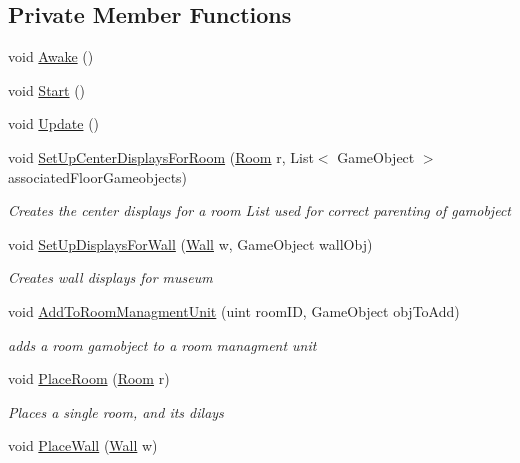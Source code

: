 \subsection*{Private Member Functions}
\begin{DoxyCompactItemize}
\item 
void \mbox{\hyperlink{class_museum_builder_a846546ea2e9bf91bba2a166dc2b01e2d}{Awake}} ()
\item 
void \mbox{\hyperlink{class_museum_builder_a33c69af71baa8a6033be9d2fc04ef5f8}{Start}} ()
\item 
void \mbox{\hyperlink{class_museum_builder_a6f66f859260dac43de5248e3c4a0b25c}{Update}} ()
\item 
void \mbox{\hyperlink{class_museum_builder_a159e037415aaf348d5a0af9561be8560}{Set\+Up\+Center\+Displays\+For\+Room}} (\mbox{\hyperlink{class_room}{Room}} r, List$<$ Game\+Object $>$ associated\+Floor\+Gameobjects)
\begin{DoxyCompactList}\small\item\em Creates the center displays for a room List used for correct parenting of gamobject \end{DoxyCompactList}\item 
void \mbox{\hyperlink{class_museum_builder_adbfb12c00a855fe0f816bc18a51a72e5}{Set\+Up\+Displays\+For\+Wall}} (\mbox{\hyperlink{class_wall}{Wall}} w, Game\+Object wall\+Obj)
\begin{DoxyCompactList}\small\item\em Creates wall displays for museum \end{DoxyCompactList}\item 
void \mbox{\hyperlink{class_museum_builder_ad1991ecd1258a2eb6d020d3c429ad9c8}{Add\+To\+Room\+Managment\+Unit}} (uint room\+ID, Game\+Object obj\+To\+Add)
\begin{DoxyCompactList}\small\item\em adds a room gamobject to a room managment unit \end{DoxyCompactList}\item 
void \mbox{\hyperlink{class_museum_builder_ad7891701beec2b305c8f0d40a7949933}{Place\+Room}} (\mbox{\hyperlink{class_room}{Room}} r)
\begin{DoxyCompactList}\small\item\em Places a single room, and it\textquotesingle{}s dilays \end{DoxyCompactList}\item 
void \mbox{\hyperlink{class_museum_builder_a5a8c364b8b6a51193a5c00d898668835}{Place\+Wall}} (\mbox{\hyperlink{class_wall}{Wall}} w)

\end{DoxyCompactItemize}
